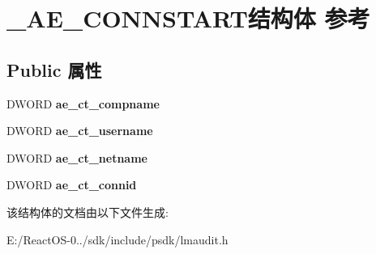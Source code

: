 \hypertarget{struct___a_e___c_o_n_n_s_t_a_r_t}{}\section{\+\_\+\+A\+E\+\_\+\+C\+O\+N\+N\+S\+T\+A\+R\+T结构体 参考}
\label{struct___a_e___c_o_n_n_s_t_a_r_t}
\subsection*{Public 属性}
\begin{DoxyCompactItemize}
\item 
\mbox{\label{struct___a_e___c_o_n_n_s_t_a_r_t_a418bbddb0bd5f41787de3483eb8f422a}} 
D\+W\+O\+RD {\bfseries ae\+\_\+ct\+\_\+compname}
\item 
\mbox{\label{struct___a_e___c_o_n_n_s_t_a_r_t_aeca7d817ddf855073e106dccd0629a3e}} 
D\+W\+O\+RD {\bfseries ae\+\_\+ct\+\_\+username}
\item 
\mbox{\label{struct___a_e___c_o_n_n_s_t_a_r_t_addea2f2337283e6813ddf960a3355650}} 
D\+W\+O\+RD {\bfseries ae\+\_\+ct\+\_\+netname}
\item 
\mbox{\label{struct___a_e___c_o_n_n_s_t_a_r_t_a1d1e98b7f755cecaa8d86ab5ca9e08e6}} 
D\+W\+O\+RD {\bfseries ae\+\_\+ct\+\_\+connid}
\end{DoxyCompactItemize}


该结构体的文档由以下文件生成\+:\begin{DoxyCompactItemize}
\item 
E\+:/\+React\+O\+S-\/0../sdk/include/psdk/lmaudit.\+h\end{DoxyCompactItemize}
